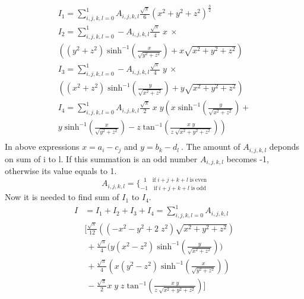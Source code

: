 \documentclass[twoside,twocolumn]{article}
\begin{document}
\begin{equation}\label {eq15}
\begin{array}{lll}

I_1 = \sum_{i,j,k,l=0}^1 A_{i,j,k,l}\frac {\sqrt{\pi} } {6} (x^2+y^2+z^2)^{\frac 3 2}\\
I_2 = \sum_{i,j,k,l=0}^1 -A_{i,j,k,l}\frac {\sqrt{\pi} } {4}\;x\ \times \\
\left((y^2 + z^2) \;\mathrm{sinh^{-1}}(\frac{x}{\sqrt{y^2 + z^2}}) +x \sqrt{x^2 + y^2 + z^2}\right)\\ 
I_3 = \sum_{i,j,k,l=0}^1 -A_{i,j,k,l}\frac {\sqrt{\pi} } {4}\;y\ \times \\
\left((x^2 + z^2)\;\mathrm{sinh^{-1}}(\frac{y}{\sqrt{x^2 + z^2}}) +y \sqrt{x^2 + y^2 + z^2}\right) \\ 
I_4 = \sum_{i,j,k,l=0}^1 A_{i,j,k,l}\frac {\sqrt{\pi} } {2}\;x\;y \left(x\;\mathrm{sinh^{-1}}(\frac{y}{\sqrt{x^2 + z^2}})+ \right.\\
\left. y\;\mathrm{sinh^{-1}}(\frac{x}{\sqrt{y^2 + z^2}}) -z\;\mathrm{tan^{-1}}(\frac{x\;y}{z\;\sqrt{x^2+y^2 + z^2}}) \right)\\ 

\end{array}
\end{equation}
In above expressions $x = a_i - c_j$ and $y = b_k - d_l\ $. The amount of $A_{i,j,k,l}$ deponds on sum of i to l. If this summation is an odd number $A_{i,j,k,l}$ becomes -1, otherwise its value equals to 1.
\begin{equation}\label{eq16}
A_{i,j,k,l} = \Big\{^{\;\;1\quad  \mathrm{if}\; i + j + k + l\; \mathrm{is \;even}}_{-1\quad  \mathrm{if}\; i + j + k + l\; \mathrm{is \;odd}}
\end{equation}
Now it is needed to find sum of $I_1$ to $I_4$.
\begin{equation}\label {eq:17}
\begin{array}{ll}
I&=I_1+I_2+I_3+I_4 = \sum_{i,j,k,l=0}^1 A_{i,j,k,l}\\
&  \bigg[ \frac {\sqrt{\pi} } {12} \left((-x^2-y^2+2\;z^2)\sqrt{x^2 + y^2 + z^2} \right) \\

& \ +  \frac {\sqrt{\pi} } {4} \bigg( y(x^2 - z^2)\;\mathrm{sinh^{-1}}(\frac{y}{\sqrt{x^2 + z^2}}) \bigg)\\
&\ +   \frac {\sqrt{\pi} } {4}\left( x(y^2-z^2)\;\mathrm{sinh^{-1}}(\frac{x}{\sqrt{y^2 + z^2}})  \right)\\ 
&\ -  \frac {\sqrt{\pi} } {2}x \;y\;z\;\mathrm{tan^{-1}}(\frac{x\;y}{z\;\sqrt{x^2+y^2 + z^2}})\bigg]

\end{array}
\end{equation}
\end{document}
